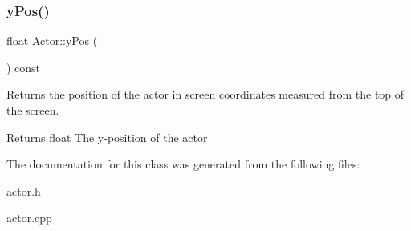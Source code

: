 \subsubsection{\texorpdfstring{yPos()}{yPos()}}
{\footnotesize\ttfamily float Actor\+::y\+Pos (\begin{DoxyParamCaption}{ }\end{DoxyParamCaption}) const\hspace{0.3cm}{\ttfamily [virtual]}}



Returns the position of the actor in screen coordinates measured from the top of the screen. 

\begin{DoxyReturn}{Returns}
float The y-\/position of the actor 
\end{DoxyReturn}


The documentation for this class was generated from the following files\+:\begin{DoxyCompactItemize}
\item 
actor.\+h\item 
actor.\+cpp\end{DoxyCompactItemize}

